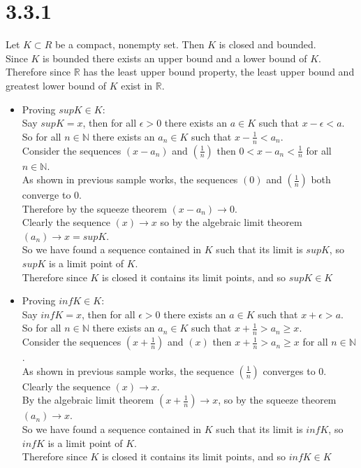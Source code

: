 \documentclass{article}
\begin{document}
\newpage
\section*{3.3.1} 
\begin{center}
    Let $K\subset R$ be a compact, nonempty set. Then $K$ is closed and bounded.
    \\Since $K$ is bounded there exists an upper bound and a lower bound of $K$.
    \\Therefore since $\mathbb{R}$ has the least upper bound property, the least upper bound and greatest lower bound of $K$ exist in $\mathbb{R}$.
    \begin{itemize}
        \item Proving $sup K\in K$:
        \\Say $sup K = x$, then for all $\epsilon > 0$ there exists an $a\in K$ such that $x -\epsilon < a$.
        \\So for all $n\in\mathbb{N}$ there exists an $a_n\in K$ such that $x -\frac{1}{n} < a_n$.
        \\Consider the sequences $(x - a_n)$ and $(\frac{1}{n})$ then $0 < x - a_n <\frac{1}{n}$ for all $n\in\mathbb{N}$.
        \\As shown in previous sample works, the sequences $(0)$ and $(\frac{1}{n})$ both converge to 0.
        \\Therefore by the squeeze theorem $(x - a_n)\rightarrow 0$.
        \\Clearly the sequence $(x)\rightarrow x$ so by the algebraic limit theorem $(a_n)\rightarrow x = sup K$.
        \\So we have found a sequence contained in $K$ such that its limit is $sup K$, so $sup K$ is a limit point of $K$.
        \\Therefore since $K$ is closed it contains its limit points, and so $sup K\in K$ \qedsymbol
        \item Proving $inf K\in K$:
        \\Say $inf K = x$, then for all $\epsilon > 0$ there exists an $a\in K$ such that $x +\epsilon > a$.
        \\So for all $n\in\mathbb{N}$ there exists an $a_n\in K$ such that $x +\frac{1}{n} > a_n\geq x$.
        \\Consider the sequences $(x +\frac{1}{n})$ and $(x)$ then $x +\frac{1}{n} > a_n\geq x$ for all $n\in\mathbb{N}$.
        \\As shown in previous sample works, the sequence $(\frac{1}{n})$ converges to 0. Clearly the sequence $(x)\rightarrow x$.
        \\By the algebraic limit theorem $(x +\frac{1}{n})\rightarrow x$, so by the squeeze theorem $(a_n)\rightarrow x$.
        \\So we have found a sequence contained in $K$ such that its limit is $inf K$, so $inf K$ is a limit point of $K$.
        \\Therefore since $K$ is closed it contains its limit points, and so $inf K\in K$ \qedsymbol
    \end{itemize}
\end{center}
\end{document}
